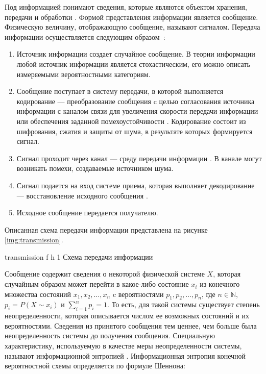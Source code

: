 Под информацией понимают сведения, которые являются объектом хранения, передачи и обработки \cite{information}. Формой представления информации является сообщение. Физическую величину, отображающую сообщение, называют сигналом. Передача информации осуществляется следующим образом~\cite{transmission}:

\begin{enumerate}
	\item Источник информации создает случайное сообщение. В теории информации любой источник информации является стохастическим, его можно описать измеряемыми вероятностными категориям.
	\item Сообщение поступает в систему передачи, в которой выполняется кодирование --- преобразование сообщения c целью согласования источника информации с каналом связи для увеличения скорости передачи информации или обеспечения заданной помехоустойчивости  \cite{information}. Кодирование состоит из шифрования, сжатия и защиты от шума, в результате которых формируется сигнал. 
	\item Сигнал проходит через канал --- среду передачи информации \cite{transmission}. В канале могут возникать помехи, создаваемые источником шума.
	\item Сигнал подается на вход системе приема, которая выполняет декодирование --- восстановление исходного сообщения \cite{information}.
	\item Исходное сообщение передается получателю.
\end{enumerate}

Описанная схема передачи информации представлена на рисунке \ref{img:transmission}.

    {transmission}
    {f}
    {h}
    {1\textwidth}
    {Схема передачи информации}
    
Сообщение содержит сведения о некоторой физической системе $X$, которая случайным образом может перейти в какое-либо состояние $x_{i}$ из конечного множества состояний $x_{1}, x_{2}, \dots, x_{n}$ c вероятностями $p_{1}, p_{2}, \dots, p_{n}$, где $n \in \mathbb{N}$, $p_{i} = P(X \sim x_{i})$ и $\sum_{i = 1}^n p_{i} = 1$. То есть, для такой системы существует степень неопределенности, которая описывается числом ее возможных состояний и их вероятностями. Сведения из принятого сообщения тем ценнее, чем больше была неопределенность системы до получения сообщения. Специальную характеристику, используемую в качестве меры неопределенности системы, называют информационной энтропией \cite{definition}. Информационная энтропия конечной вероятностной схемы определяется по формуле Шеннона:

